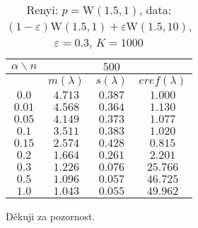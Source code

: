 \documentclass[11pt,a4paper]{beamer}
\begin{document}
\begin{frame}
\begin{table}[ht] \footnotesize 
\begin{center} 
\begin{tabular}{|c|ccc|} 
\hline 
$\alpha\backslash n$ &&  $500$ & \\ 
\hline 
& $m(\lambda)$ & $s(\lambda)$ & $eref(\lambda)$ \\ 
\hline 
$0.0$ & $ 4.713 $ & $ 0.387 $ & $ 1.000 $\\ 
\hline 
$0.01$ & $ 4.568 $ & $ 0.364 $ & $ 1.130 $\\ 
\hline 
$0.05$ & $ 4.149 $ & $ 0.373 $ & $ 1.077 $\\ 
\hline 
$0.1$ &$ 3.511 $ & $ 0.383 $ & $ 1.020 $\\ 
\hline 
$0.15$ & $ 2.574 $ & $ 0.428 $ & $ 0.815 $\\ 
\hline 
$0.2$ & $ 1.664 $ & $ 0.261 $ & $ 2.201 $\\ 
\hline 
$0.3$ &  $ 1.226 $ & $ 0.076 $ & $ 25.766 $\\ 
\hline 
$0.5$ & $ 1.096 $ & $ 0.057 $ & $ 46.725 $\\ 
\hline 
$1.0$ & $ 1.043 $ & $ 0.055 $ & $ 49.962 $\\ 
\hline 
\end{tabular}
\caption{Renyi: $p = \mathrm{W}(1.5,1)$, data: $(1-\varepsilon)\mathrm{W}(1.5,1) + \varepsilon \mathrm{W}(1.5,10)$, $\varepsilon =  0.3$, $K = 1000$} 
\end{center}
\end{table}
\end{frame}
%
%		

\begin{frame}
	\begin{center}
		Děkuji za pozornost.
	\end{center}
\end{frame}
\end{document}
